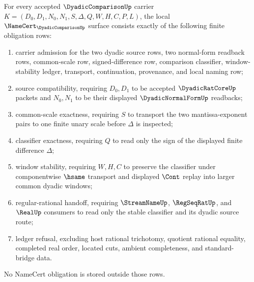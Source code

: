 \begin{theorem}
\label{thm:dyadic-comparison-namecert-obligations}
For every accepted $\DyadicComparisonUp$ carrier $K=(D_0,D_1,N_0,N_1,S,\Delta,Q,W,H,C,P,L)$, the local $\NameCert_{\DyadicComparisonUp}$ surface consists exactly of the following finite obligation rows:
\begin{enumerate}
\item carrier admission for the two dyadic source rows, two normal-form readback rows, common-scale row, signed-difference row, comparison classifier, window-stability ledger, transport, continuation, provenance, and local naming row;
\item source compatibility, requiring $D_0,D_1$ to be accepted $\DyadicRatCoreUp$ packets and $N_0,N_1$ to be their displayed $\DyadicNormalFormUp$ readbacks;
\item common-scale exactness, requiring $S$ to transport the two mantissa-exponent pairs to one finite unary scale before $\Delta$ is inspected;
\item classifier exactness, requiring $Q$ to read only the sign of the displayed finite difference $\Delta$;
\item window stability, requiring $W,H,C$ to preserve the classifier under componentwise $\hsame$ transport and displayed $\Cont$ replay into larger common dyadic windows;
\item regular-rational handoff, requiring $\StreamNameUp$, $\RegSeqRatUp$, and $\RealUp$ consumers to read only the stable classifier and its dyadic source route;
\item ledger refusal, excluding host rational trichotomy, quotient rational equality, completed real order, located cuts, ambient completeness, and standard-bridge data.
\end{enumerate}
No NameCert obligation is stored outside those rows.
\end{theorem}
